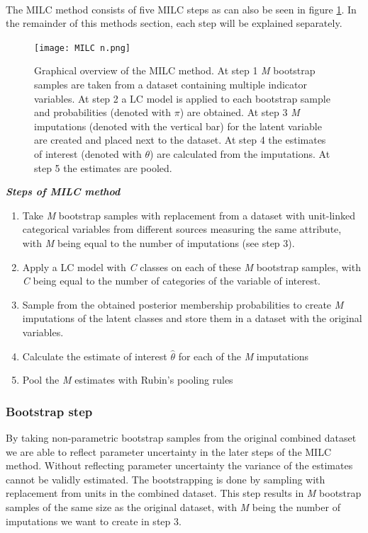\documentclass[a4paper, 11pt]{article} %
\begin{document}
\\The MILC method consists of five MILC steps as can also be seen in figure \ref{fig:MILC}. In the remainder of this methods section, each step will be explained separately.

\newpage
\begin{figure}[h]
    \centering
    \texttt{[image: MILC n.png]}
    \caption{Graphical overview of the MILC method. At step 1 \textit{M} bootstrap samples are taken from a dataset containing multiple indicator variables. At step 2 a LC model is applied to each bootstrap sample and probabilities (denoted with $\pi$) are obtained. At step 3 \textit{M} imputations (denoted with the vertical bar) for the latent variable are created and placed next to the dataset. At step 4 the estimates of interest (denoted with $\theta$) are calculated from the imputations. At step 5 the estimates are pooled.}
    \label{fig:MILC}
\end{figure}

\textit{\textbf{Steps of MILC method}
}\begin{enumerate}
\item Take \textit{M} bootstrap samples with replacement from a dataset with unit-linked categorical variables from different sources measuring the same attribute, with \textit{M} being equal to the number of imputations (see step 3).
\item	Apply a LC model with \textit{C} classes on each of these \textit{M} bootstrap samples, with \textit{C} being equal to the number of categories of the variable of interest. 
\item	Sample from the obtained posterior membership probabilities to create \textit{M} imputations of the latent classes and store them in a dataset with the original variables.
\item	Calculate the estimate of interest $\hat{\theta}$ for each of the \textit{M} imputations
\item	Pool the \textit{M} estimates with Rubin’s pooling rules
\end{enumerate}



\subsubsection{Bootstrap step}
By taking non-parametric bootstrap samples from the original combined dataset we are able to reflect parameter uncertainty in the later steps of the MILC method. Without reflecting parameter uncertainty the variance of the estimates cannot be validly estimated. The bootstrapping is done by sampling with replacement from units in the combined dataset. This step results in \textit{M} bootstrap samples of the same size as the original dataset, with \textit{M} being the number of imputations we want to create in step 3. 
\end{document}
